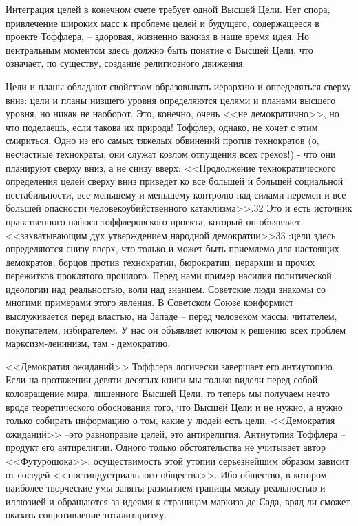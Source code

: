 \documentclass{book}
\begin{document}
{Интеграция целей в конечном счете требует одной Высшей Цели. Нет спора, привлечение широких масс к проблеме целей и будущего, содержащееся в проекте Тоффлера, -- здоровая, жизненно важная в наше время идея. Но центральным момен­том здесь должно быть понятие о Высшей Цели, что означает, по существу, создание религиозного движения.

Цели и планы обладают свойством образовывать иерархию и определяться сверху вниз: цели и планы низшего уровня определяются целями и планами высшего уровня, но никак не наоборот. Это, конечно, очень <<не демократично>>, но что поде­лаешь, если такова их природа! Тоффлер, однако, не хочет с этим смириться. Одно из его самых тяжелых обвинений против технократов (о, несчастные технократы, они служат козлом отпущения всех грехов!) ‑ что они планируют сверху вниз, а не снизу вверх: <<Продолжение технократического определения целей сверху вниз приведет ко все большей и большей социаль­ной нестабильности, все меньшему и меньшему контролю над си­лами перемен и все большей опасности человекоубийственного катаклизма>>.32 Это и есть источник нравственного пафоса тоффлеровского проекта, который он объявляет <<захватыва­ющим дух утверждением народной демократии>>33 :цели здесь определяются снизу вверх, что только и может быть приемлемо для настоящих демократов, борцов против технократии, бю­рократии, иерархии и прочих пережитков проклятого прошлого. Перед нами пример насилия политической идеологии над реаль­ностью, воли над знанием. Советские люди знакомы со многи­ми примерами этого явления. В Советском Союзе конформист выслуживается перед властью, на Западе -- перед человеком мас­сы: читателем, покупателем, избирателем. У нас он объявляет ключом к решению всех проблем марксизм‑ленинизм, там ‑ демократию.

<<Демократия ожиданий>> Тоффлера логически завершает его антиутопию. Если на протяжении девяти десятых книги мы только видели перед собой коловращение мира, лишенного Высшей Цели, то теперь мы получаем нечто вроде теоретиче­ского обоснования того, что Высшей Цели и не нужно, а нужно только собирать информацию о том, какие у людей есть  цели. <<Демократия ожиданий>> --это равноправие целей, это анти­религия. Антиутопия Тоффлера -- продукт его антирелигии. Одного только обстоятельства не учитывает автор <<Футурошока>>: осуществимость этой утопии серьезнейшим образом за­висит от соседей <<постиндустриального общества>>. Ибо общест­во, в котором наиболее творческие умы заняты размытием гра­ницы между реальностью и иллюзией и обращаются за идеями к страницам маркиза де Сада, вряд ли сможет оказать сопротив­ление тоталитаризму.

}
\end{document}

